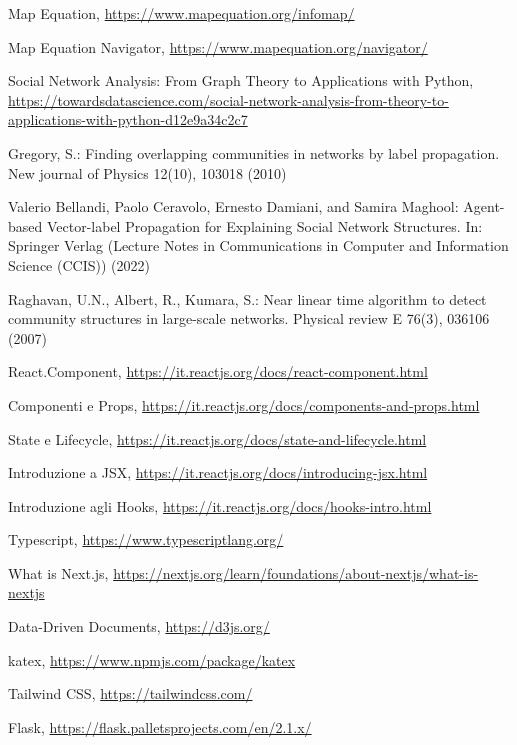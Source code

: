 \documentclass[a4paper,12pt]{report}
\begin{document}
%
%
\begin{thebibliography}{0}
%
Map Equation, \url{https://www.mapequation.org/infomap/}

Map Equation Navigator, \url{https://www.mapequation.org/navigator/}

Social Network Analysis: From Graph Theory to Applications with Python, \url{https://towardsdatascience.com/social-network-analysis-from-theory-to-applications-with-python-d12e9a34c2c7}

Gregory, S.: Finding overlapping communities in networks by label propagation.
New journal of Physics 12(10), 103018 (2010)

Valerio Bellandi, Paolo Ceravolo, Ernesto Damiani, and Samira Maghool: Agent-based Vector-label Propagation for Explaining Social Network Structures. In: Springer Verlag (Lecture Notes in Communications in Computer and Information Science (CCIS)) (2022)

Raghavan, U.N., Albert, R., Kumara, S.: Near linear time algorithm to detect
community structures in large-scale networks. Physical review E 76(3), 036106
(2007)

React.Component, \url{https://it.reactjs.org/docs/react-component.html}

Componenti e Props, \url{https://it.reactjs.org/docs/components-and-props.html}

State e Lifecycle, \url{https://it.reactjs.org/docs/state-and-lifecycle.html}

Introduzione a JSX, \url{https://it.reactjs.org/docs/introducing-jsx.html}

Introduzione agli Hooks, \url{https://it.reactjs.org/docs/hooks-intro.html}

Typescript, \url{https://www.typescriptlang.org/}

What is Next.js, \url{https://nextjs.org/learn/foundations/about-nextjs/what-is-nextjs}

Data-Driven Documents, \url{https://d3js.org/}

katex, \url{https://www.npmjs.com/package/katex}

Tailwind CSS, \url{https://tailwindcss.com/}

Flask, \url{https://flask.palletsprojects.com/en/2.1.x/}


\end{thebibliography}
\end{document}
